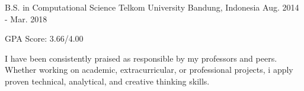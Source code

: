 \begin{cventries}

  \cventry
    {B.S. in Computational Science} %
    {Telkom University} %
    {Bandung, Indonesia} %
    {Aug. 2014 - Mar. 2018} %
    {
      \begin{cvitems} %
        \item {GPA Score: 3.66/4.00}
        \item {I have been consistently praised as responsible by my professors and peers. Whether working on academic, extracurricular, or professional projects, i apply proven technical, analytical, and creative thinking skills.}
      \end{cvitems}
    }

\end{cventries}
